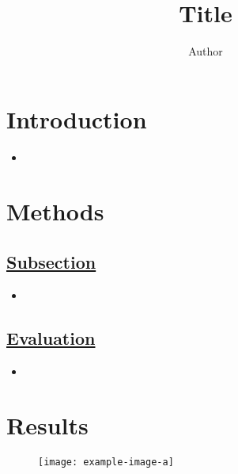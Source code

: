 \documentclass[portrait,color=UCLburgundy,margin=2cm]{uclposter}
\begin{document}
\title{Title}

\author[1 *]{Author}


\maketitle

\begin{multicols}{2}
\normalsize

\section*{Introduction}
    \begin{highlightbox}[UCLlightgreen]
        \begin{itemize}
            \item \blindtext
        \end{itemize}
    \end{highlightbox}

\section*{Methods}
    \subsection*{\underline{\textbf{Subsection}}}
        \begin{itemize}
            \item \blindtext
        \end{itemize}
    
    \subsection*{\underline{\textbf{Evaluation}}}
        \begin{highlightbox}[UCLlightgreen]
            \begin{itemize}
                \item \blindtext
            \end{itemize}
        \end{highlightbox}

\section*{Results}
    \begin{figure}[H]
        \centering
        \texttt{[image: example-image-a]}
        \begin{highlightbox}[UCLlightblue]
            \captionsetup{singlelinecheck=false, justification=centering}
            \caption{\blindtext}
        \end{highlightbox}
    \end{figure}


\end{multicols}
\end{document}
